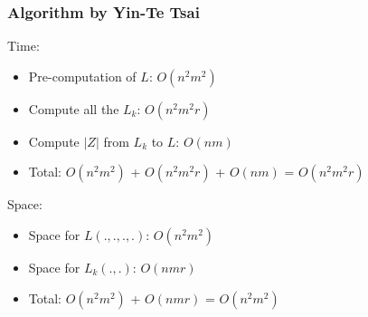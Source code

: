 \documentclass[10pt]{beamer}
\begin{document}
\begin{frame}
  \frametitle{Algorithm by Yin-Te Tsai}

\pause
Time:

\begin{itemize}
  \item<3-> Pre-computation of $L$: $O(n^2m^2)$
  \item<4-> Compute all the $L_k$: $O(n^2m^2r)$
  \item<5-> Compute $|Z|$ from $L_k$ to $L$: $O(nm)$
  \item<6-> Total: $O(n^2m^2)$ + $O(n^2m^2r)$ + $O(nm)$ = $O(n^2m^2r)$
\end{itemize}

\vskip15pt

\pause\pause\pause\pause\pause
Space:

\begin{itemize}
  \item<8-> Space for $L(.,.,.,.)$: $O(n^2m^2)$
  \item<9-> Space for $L_k(.,.)$: $O(nmr)$
  \item<10-> Total: $O(n^2m^2)$ + $O(nmr)$ = $O(n^2m^2)$
\end{itemize}

\end{frame}
\end{document}
